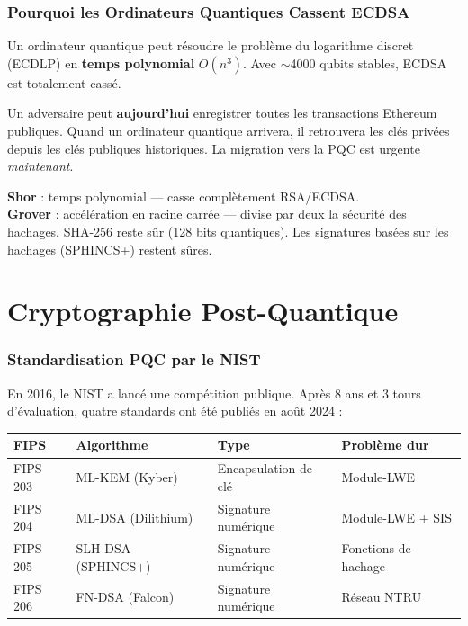 \documentclass[11pt,a4paper]{article}
\begin{document}
\section{Pourquoi les Ordinateurs Quantiques Cassent ECDSA}

\begin{warningbox}
Un ordinateur quantique peut résoudre le problème du logarithme discret (ECDLP) en \textbf{temps polynomial} $O(n^3)$. Avec $\sim$4000 qubits stables, ECDSA est totalement cassé.
\end{warningbox}

\begin{warningbox}
Un adversaire peut \textbf{aujourd'hui} enregistrer toutes les transactions Ethereum publiques. Quand un ordinateur quantique arrivera, il retrouvera les clés privées depuis les clés publiques historiques. La migration vers la PQC est urgente \emph{maintenant}.
\end{warningbox}

\begin{infobox}
\textbf{Shor} : temps polynomial --- casse complètement RSA/ECDSA.\\
\textbf{Grover} : accélération en racine carrée --- divise par deux la sécurité des hachages. SHA-256 reste sûr (128 bits quantiques). Les signatures basées sur les hachages (SPHINCS+) restent sûres.
\end{infobox}

\newpage
\part{Cryptographie Post-Quantique}

\section{Standardisation PQC par le NIST}

En 2016, le NIST a lancé une compétition publique. Après 8 ans et 3 tours d'évaluation, quatre standards ont été publiés en août 2024 :

\begin{center}
\begin{tabular}{llll}
\toprule
\textbf{FIPS} & \textbf{Algorithme} & \textbf{Type} & \textbf{Problème dur} \\
\midrule
FIPS 203 & ML-KEM (Kyber)     & Encapsulation de clé & Module-LWE \\
FIPS 204 & ML-DSA (Dilithium) & Signature numérique  & Module-LWE + SIS \\
FIPS 205 & SLH-DSA (SPHINCS+) & Signature numérique  & Fonctions de hachage \\
FIPS 206 & FN-DSA (Falcon)    & Signature numérique  & Réseau NTRU \\
\bottomrule
\end{tabular}
\end{center}
\end{document}

